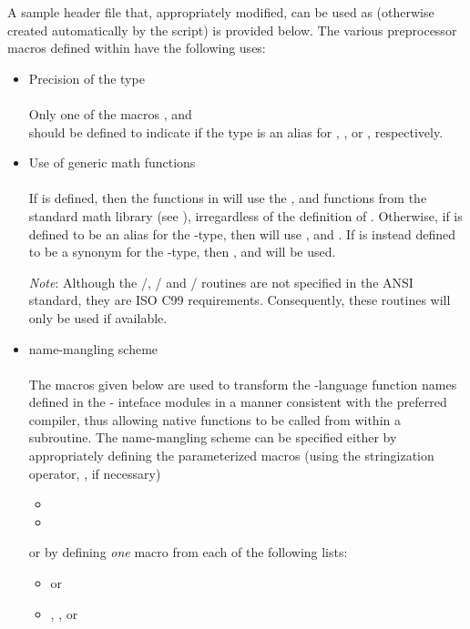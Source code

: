 A sample header file that, appropriately modified, can be used
as  (otherwise created automatically by the  script)
is provided below. The various preprocessor macros defined within 
have the following uses:
\begin{itemize}

\item Precision of the {\sundials}  type\\ \\
  Only one of the macros ,  and \\
   should be defined to indicate if the {\sundials}
   type is an alias for , , or ,
  respectively.

\item Use of generic math functions\\ \\
  If  is defined, then the functions
  in  will use the ,  and 
  functions from the standard math library (see ), irregardless of the definition of .
  Otherwise, if  is defined to be an alias for the  {\C}-type, then
  {\sundials} will use ,  and .
  If  is instead defined to be a synonym for the  {\C}-type,
  then ,  and  will be used.

  {\em Note}: Although the /, / and /
  routines are not specified in the ANSI {\C} standard, they are ISO C99 requirements. Consequently,
  these routines will only be used if available.

\item {\F} name-mangling scheme\\ \\
  The macros given below are used to transform the {\C}-language function names defined in the
  {\F}-{\C} inteface modules in a manner consistent with the preferred {\F} compiler, thus
  allowing native {\C} functions to be called from within a {\F} subroutine. The name-mangling
  scheme can be specified either by appropriately defining the parameterized macros (using the
  stringization operator, \id{\#\#}, if necessary)
  \begin{itemize}
  \item {}
  \item {}
  \end{itemize}
  or by defining {\em one} macro from each of the following lists:
  \begin{itemize}
  \item {} or 
  \item {}, , or 
  \end{itemize}


\end{itemize}
